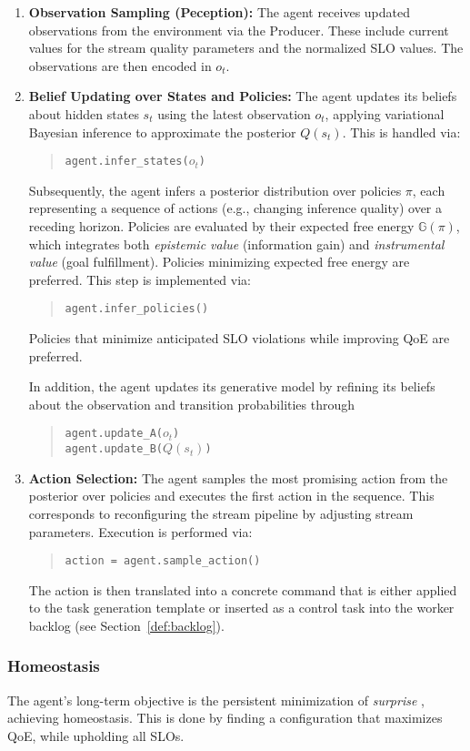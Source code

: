 \begin{enumerate}
    \item \textbf{Observation Sampling (Peception):} The agent receives updated observations from the environment via the Producer. These include current values for the stream quality parameters and the normalized SLO values. The observations are then encoded in \(o_t\).

    \item \textbf{Belief Updating over States and Policies:} The agent updates its beliefs about hidden states $s_t$ using the latest observation \(o_t\), applying variational Bayesian inference to approximate the posterior \(Q(s_t)\). This is handled via:
    \begin{quote}
        \texttt{agent.infer\_states(\(o_t\))}
    \end{quote}
    Subsequently, the agent infers a posterior distribution over policies $\pi$, each representing a sequence of actions (e.g., changing inference quality) over a receding horizon. Policies are evaluated by their expected free energy $\mathbb{G}(\pi)$, which integrates both \emph{epistemic value} (information gain) and \emph{instrumental value} (goal fulfillment). Policies minimizing expected free energy are preferred. This step is implemented via:
    \begin{quote}
        \texttt{agent.infer\_policies()}
    \end{quote}
     Policies that minimize anticipated SLO violations while improving QoE are preferred.

     In addition, the agent updates its generative model by refining its beliefs about the observation and transition probabilities through
    \begin{quote}
        \texttt{agent.update\_A(\(o_t\))} \\
        \texttt{agent.update\_B(\(Q(s_t)\))}
    \end{quote}
    
    \item \textbf{Action Selection:} The agent samples the most promising action from the posterior over policies and executes the first action in the sequence. This corresponds to reconfiguring the stream pipeline by adjusting stream parameters. Execution is performed via:
    \begin{quote}
        \texttt{action = agent.sample\_action()}
    \end{quote}
    The action is then translated into a concrete command that is either applied to the task generation template or inserted as a control task into the worker backlog (see Section~\ref{def:backlog}).
\end{enumerate}

\subsubsection{Homeostasis}
The agent's long-term objective is the persistent minimization of \textit{surprise} \cite{sedlak_adaptive_2024}, achieving homeostasis. This is done by finding a configuration that maximizes QoE, while upholding all SLOs.